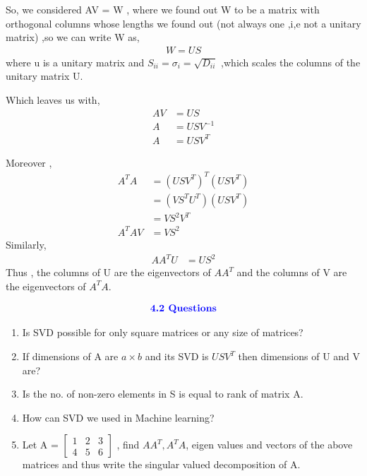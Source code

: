 \documentclass[12pt,a4paper]{article}
\begin{document}
{So, we considered AV = W , where we found out W to be a matrix with orthogonal columns whose lengths we found out (not always one ,i,e not a unitary matrix) ,so we can write W as,
\begin{align*}
    W = US 
\end{align*}
where u is a unitary matrix and $S_{ii} = \sigma_i = \sqrt{D_{ii}}$ ,which scales the columns of the unitary matrix U.

Which leaves us with,
\begin{align*}
    AV &= US \\
    A &= USV^{-1} \\
    A &= USV^T
\end{align*}

Moreover , 
\begin{align*}
    A^TA &= (USV^T)^T (USV^T) \\
         &= (VS^TU^T)(USV^T) \\
         &= VS^2V^T \\
    A^TAV &= VS^2 
\end{align*}
Similarly,
\begin{align*}
    AA^TU &= US^2
\end{align*}
Thus , the columns of U are the eigenvectors of $AA^T$ and the columns of V are the eigenvectors of $A^TA$. 

\begin{align*}
   \textcolor{blue}{ \text{{\textbf{4.2 Questions}}}}
\end{align*}

\begin{enumerate}
    \item Is SVD possible for only square matrices or any size of matrices?
    \item If dimensions of A are $a \times b$ and its SVD is $USV^T$ then dimensions of U and V are?
    \item Is the no. of non-zero elements in S is equal to rank of matrix A.
    \item How can SVD we used in Machine learning?
    \item Let A = $\begin{bmatrix}
                    1 & 2 & 3\\
                    4 & 5 & 6
                \end{bmatrix}$ , find $AA^T , A^TA $, eigen values and vectors of the above matrices and thus write the singular valued decomposition of A.
\end{enumerate}

}
\end{document}
